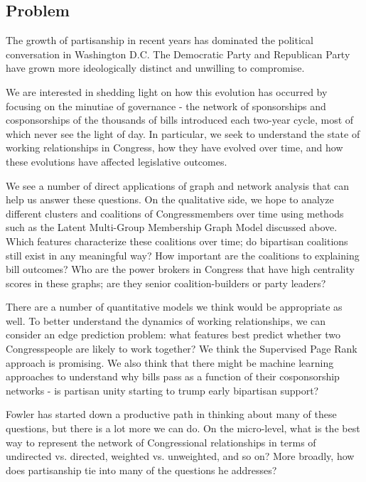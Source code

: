\subsection{Problem}

The growth of partisanship in recent years has dominated the political conversation in Washington D.C. The Democratic Party and Republican Party have grown more ideologically distinct and unwilling to compromise. 

We are interested in shedding light on how this evolution has occurred by focusing on the minutiae of governance - the network of sponsorships and cosponsorships of the thousands of bills introduced each two-year cycle, most of which never see the light of day. In particular, we seek to understand the state of working relationships in Congress, how they have evolved over time, and how these evolutions have affected legislative outcomes.

We see a number of direct applications of graph and network analysis that can help us answer these questions. On the qualitative side, we hope to analyze different clusters and coalitions of Congressmembers over time using methods such as the Latent Multi-Group Membership Graph Model discussed above. Which features characterize these coalitions over time; do bipartisan coalitions still exist in any meaningful way? How important are the coalitions to explaining bill outcomes? Who are the power brokers in Congress that have high centrality scores in these graphs; are they senior coalition-builders or party leaders?

There are a number of quantitative models we think would be appropriate as well. To better understand the dynamics of working relationships, we can consider an edge prediction problem: what features best predict whether two Congresspeople are likely to work together? We think the Supervised Page Rank approach is promising. We also think that there might be machine learning approaches to understand why bills pass as a function of their cosponsorship networks - is partisan unity starting to trump early bipartisan support?

Fowler has started down a productive path in thinking about many of these questions, but there is a lot more we can do. On the micro-level, what is the best way to represent the network of Congressional relationships in terms of undirected vs. directed, weighted vs. unweighted, and so on? More broadly, how does partisanship tie into many of the questions he addresses?


